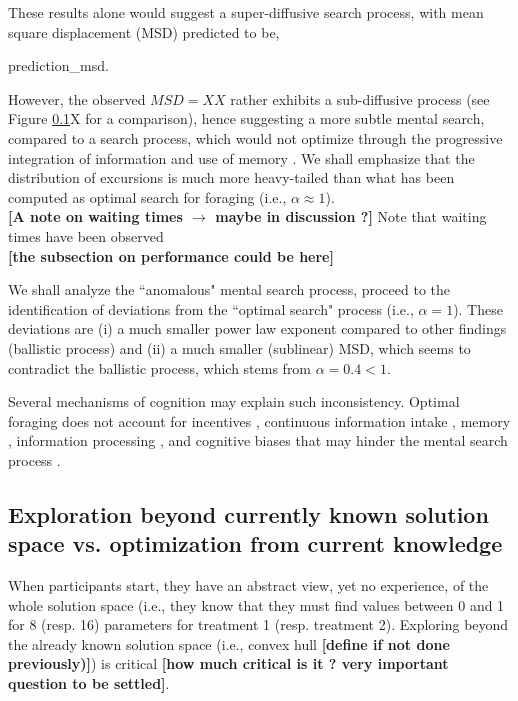 These results alone would suggest a super-diffusive search process, with mean square displacement (MSD) predicted to be,

\be
prediction_msd.
\ee


However, the observed $MSD  =  XX$ rather exhibits a sub-diffusive process (see Figure \ref{}X for a comparison), hence suggesting a more subtle mental search, compared to a search process, which would not optimize through the progressive integration of information \cite{} and use of memory \cite{}. We shall emphasize that the distribution of excursions is much more heavy-tailed than what has been computed as optimal search for foraging (i.e., $\alpha \approx 1$\cite{viswanathan_optimizing_1999,reynolds_displaced_2007,viswanathan_physics_2011}). \\

{\bf [A note on waiting times $\rightarrow$ maybe in discussion ?]} Note that waiting times  have been observed \cite{humphries_optimal_2014,song_modelling_2010}\\


{\bf [the subsection on performance could be here]}


We shall analyze the ``anomalous" mental search process, proceed to the identification of deviations from the ``optimal search" process (i.e., $\alpha = 1$). These deviations are (i) a much smaller power law exponent compared to other findings (ballistic process) and (ii) a much smaller (sublinear) MSD, which seems to contradict the ballistic process, which stems from $\alpha = 0.4 < 1$. 

Several mechanisms of cognition may explain such inconsistency.  Optimal foraging does not account for incentives \cite{}, continuous information intake \cite{}, memory \cite{}, information processing \cite{}, and cognitive biases that may hinder the mental search process \cite{}. 


\subsection{Exploration beyond currently known solution space vs. optimization from current knowledge}

When participants start, they have an abstract view, yet no experience, of the whole solution space (i.e., they know that they must find values between 0 and 1 for 8 (resp. 16) parameters for treatment 1 (resp. treatment 2). Exploring beyond the already known solution space (i.e., convex hull {\bf [define if not done previously)]}) is critical {\bf [how much critical is it ? very important question to be settled]}.

